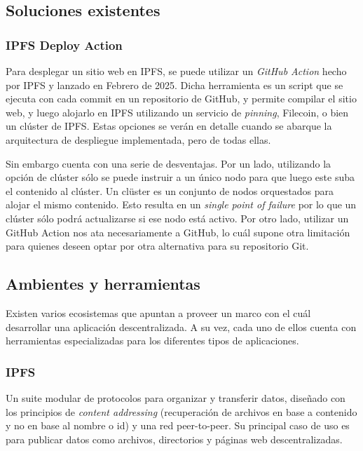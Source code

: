 \subsection{Soluciones existentes}

\subsubsection{IPFS Deploy Action}
Para desplegar un sitio web en IPFS, se puede utilizar un \textit{GitHub Action} hecho por IPFS y lanzado en Febrero de 2025. Dicha herramienta es un script que se ejecuta con cada commit en un repositorio de GitHub, y permite compilar el sitio web, y luego alojarlo en IPFS utilizando un servicio de \textit{pinning}, Filecoin, o bien un clúster de IPFS. Estas opciones se verán en detalle cuando se abarque la arquitectura de despliegue implementada, pero de todas ellas.

Sin embargo cuenta con una serie de desventajas. Por un lado, utilizando la opción de clúster sólo se puede instruir a un único nodo para que luego este suba el contenido al clúster. Un clüster es un conjunto de nodos orquestados para alojar el mismo contenido. Esto resulta en un \textit{single point of failure} por lo que un clúster sólo podrá actualizarse si ese nodo está activo. Por otro lado, utilizar un GitHub Action nos ata necesariamente a GitHub, lo cuál supone otra limitación para quienes deseen optar por otra alternativa para su repositorio Git.

\subsection{Ambientes y herramientas}
Existen varios ecosistemas que apuntan a proveer un marco con el cuál desarrollar una aplicación descentralizada. A su vez, cada uno de ellos cuenta con herramientas especializadas para los diferentes tipos de aplicaciones.

\subsubsection{IPFS}
Un suite modular de protocolos para organizar y transferir datos, diseñado con los principios de \textit{content addressing} (recuperación de archivos en base a contenido y no en base al nombre o id) y una red peer-to-peer. Su principal caso de uso es para publicar datos como archivos, directorios y páginas web descentralizadas.\cite{ipfs}

